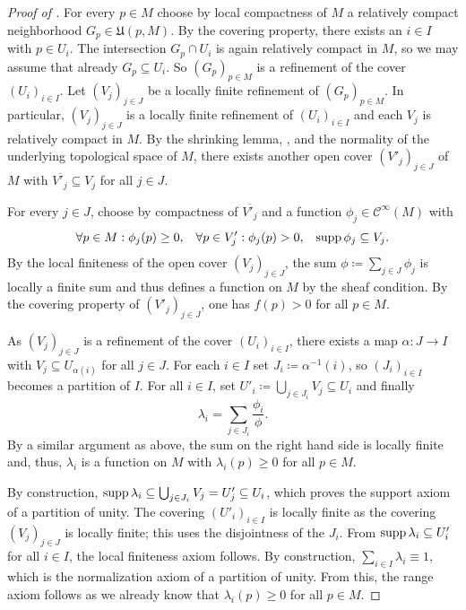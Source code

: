 \begin{proof}[Proof of ]
  For every $p \in M$ choose by local compactness of $M$ a relatively compact neighborhood $G_p
  \in \mathfrak U(p, M)$. By the covering property, there exists an $i \in I$ with
  $p \in U_i$. The intersection $G_p \cap U_i$ is again relatively compact in $M$,
  so we may assume that already $G_p \subseteq U_i$. So  
  $(G_p)_{p \in M}$ is a refinement of the cover $(U_i)_{i \in I}$.
  Let $(V_j)_{j \in J}$ be a locally finite refinement of $(G_p)_{p \in M}$. In
  particular, $(V_j)_{j \in J}$ is a locally finite refinement of $(U_i)_{i \in I}$
  and each $V_j$ is relatively compact in $M$. By the shrinking lemma, ,
  and the normality of the underlying topological space of $M$, there exists
  another open cover $(V'_j)_{j \in J}$ of $M$ with
  $\overline{V'_j} \subseteq V_j$ for all $j \in J$.
  
  For every $j \in J$, choose by compactness of $\overline{V'_j}$ and
   a function
  $\phi_j \in \mathcal C^\infty(M)$ with
  \begin{align*}
    \forall p \in M: \phi_j(p) & \ge 0, &
    \forall p \in V'_j: \phi_j(p) & > 0, &
    \operatorname{supp} \phi_j \subseteq V_j.
  \end{align*}
  By the local finiteness of the open cover $(V_j)_{j \in J}$, the sum
  $\phi \coloneqq \sum_{j \in J} \phi_j$ is locally a finite sum and thus defines
  a function on $M$ by the sheaf condition. By the covering property of
  $(V'_j)_{j \in J}$,
  one has $f(p) > 0$ for all $p \in M$.
  
  As $(V_j)_{j \in J}$ is a refinement of the cover $(U_i)_{i \in I}$, there exists a
  map $\alpha\colon J \to I$ with $V_j \subseteq U_{\alpha(i)}$ for all $j \in J$.
  For each $i \in I$ set $J_i \coloneqq \alpha^{-1}(i)$, so $(J_i)_{i \in I}$ becomes
  a partition of $I$. For all $i \in I$, set
  $U'_i \coloneqq \bigcup_{j \in J_i} V_j \subseteq U_i$ and finally
  \[
    \lambda_i = \sum_{j \in J_i} \frac{\phi_i}{\phi}.
  \]
  By a similar argument as above, the sum on the right hand side is locally finite
  and, thus, $\lambda_i$ is a function on $M$ with $\lambda_i(p) \ge 0$ for all
  $p \in M$.
  
  By construction, $\operatorname{supp} \lambda_i \subseteq \bigcup_{j \in J_i} V_j = U'_j \subseteq
  U_i$, which proves the support axiom of a partition of unity. The covering
  $(U'_i)_{i \in I}$ is locally finite as the covering $(V_j)_{j \in J}$ is locally
  finite; this uses the disjointness of the $J_i$. From $\operatorname{supp} \lambda_i \subseteq U'_i$
  for all $i \in I$, the local finiteness axiom follows. By construction,
  $\sum_{i \in I} \lambda_i \equiv 1$, which is the normalization axiom of a
  partition of unity.
  From this, the range axiom follows as we already know that $\lambda_i(p) \ge 0$
  for all $p \in M$.
\end{proof}

